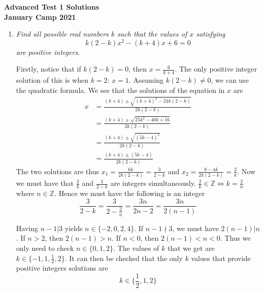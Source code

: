 \documentclass{article}
\begin{document}
\thispagestyle{empty}

\begin{center}
  \textbf{\Large Advanced Test 1 Solutions}
  \\ \vspace{1em}
  \textbf{\large January Camp 2021}
\end{center}

\vspace{24pt}

\begin{enumerate}[1.]

\item %
{\itshape Find all possible real numbers $k$ such that the values of $x$ satisfying
$$k(2 - k)x^2 - (k + 4)x + 6 = 0$$
are positive integers.}

Firstly, notice that if $k(2 - k) = 0$, then $x = \frac{6}{k + 4}$. The only positive integer solution of this is when $k = 2$: $x = 1$.
Assuming $k(2 - k) \ne 0$, we can use the quadratic formula. We see that the solutions of the equation in $x$ are
\begin{align*}
    x &= \frac{(k + 4) \pm \sqrt{(k + 4)^2 - 24k(2 - k)}}{2k(2 - k)} \\
    &= \frac{(k + 4) \pm \sqrt{25k^2 - 40k + 16}}{2k(2 - k)} \\
    &= \frac{(k + 4) \pm \sqrt{(5k - 4)^2}}{2k(2 - k)} \\
    &= \frac{(k + 4) \pm (5k - 4)}{2k(2 - k)}
\end{align*}
The two solutions are thus $x_1 = \frac{6k}{2k(2 - k)} = \frac{3}{2 - k}$ and $x_2 = \frac{8 - 4k}{2k(2 - k)} = \frac{2}{k}$. Now we must have that $\frac{2}{k}$ and $\frac{3}{2 - k}$ are integers simultaneously. $\frac{2}{k} \in \mathbb{Z} \iff k = \frac{2}{n}$ where $n \in \mathbb{Z}$. Hence we must have the following is an integer 
$$\frac{3}{2 - k} = \frac{3}{2 - \frac{2}{n}} = \frac{3n}{2n - 2}= \frac{3n}{2(n - 1)}$$

Having $n - 1 | 3$ yields $n \in \{-2, 0, 2, 4\}$. If $n - 1 \nmid 3$, we must have $2(n - 1) | n$. If $n > 2$, then $2(n - 1) > n$. If $n < 0$, then $2(n - 1) < n < 0$. Thus we only need to check $n \in \{0, 1, 2\}$. The values of $k$ that we get are $k \in \{-1, 1, \frac{1}{2}, 2\}$. It can then be checked that the only $k$ values that provide positive integers solutions are 
$$k \in \{\frac{1}{2}, 1, 2\}$$


\end{enumerate}
\end{document}
